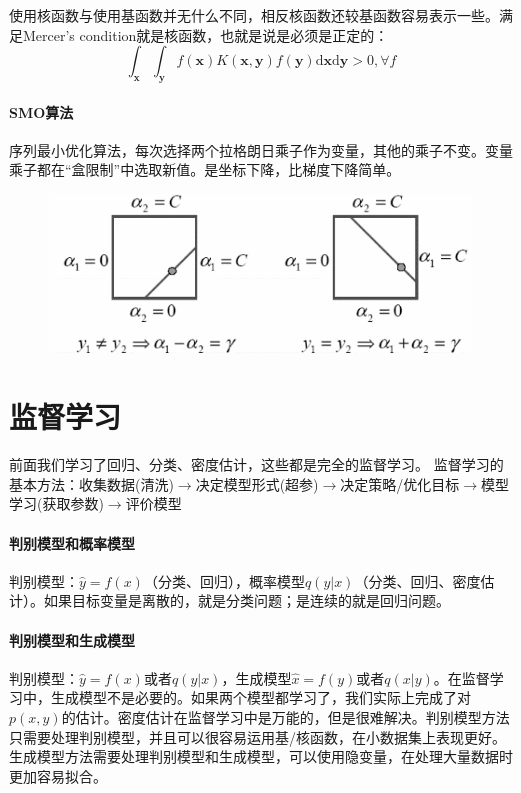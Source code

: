 使用核函数与使用基函数并无什么不同，相反核函数还较基函数容易表示一些。满足Mercer's condition就是核函数，也就是说是必须是正定的：
$$\int_{\bm x}\int_{\bm y}f(\bm x)K(\bm x, \bm y)f(\bm y)\mathrm{d}\bm x\mathrm{d}\bm y > 0, \forall f$$

\paragraph{SMO算法}
序列最小优化算法，每次选择两个拉格朗日乘子作为变量，其他的乘子不变。变量乘子都在“盒限制”中选取新值。是坐标下降，比梯度下降简单。

\begin{figure}[H]
    \centering
\includegraphics[width=0.7\columnwidth]{sl/smo.png}
\end{figure}

\section{监督学习}
前面我们学习了回归、分类、密度估计，这些都是完全的监督学习。
监督学习的基本方法：收集数据(清洗)$\rightarrow$决定模型形式(超参)$\rightarrow$决定策略/优化目标$\rightarrow$模型学习(获取参数)$\rightarrow$评价模型

\paragraph{判别模型和概率模型}
判别模型：$\hat{y} = f(x)$（分类、回归），概率模型$q(y|x)$（分类、回归、密度估计）。如果目标变量是离散的，就是分类问题；是连续的就是回归问题。

\paragraph{判别模型和生成模型}
判别模型：$\hat{y} = f(x)$或者$q(y|x)$，生成模型$\hat{x} = f(y)$或者$q(x|y)$。在监督学习中，生成模型不是必要的。如果两个模型都学习了，我们实际上完成了对$p(x,y)$的估计。密度估计在监督学习中是万能的，但是很难解决。判别模型方法只需要处理判别模型，并且可以很容易运用基/核函数，在小数据集上表现更好。生成模型方法需要处理判别模型和生成模型，可以使用隐变量，在处理大量数据时更加容易拟合。

